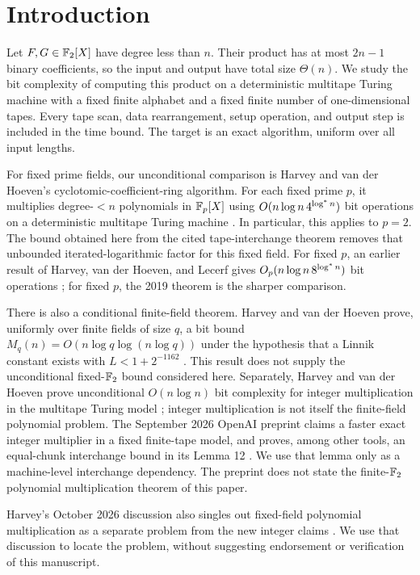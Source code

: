 \section{Introduction}

Let $F,G\in\mathbb F_2[X]$ have degree less than $n$. Their product has at most $2n-1$ binary coefficients, so the input and output have total size $\Theta(n)$. We study the bit complexity of computing this product on a deterministic multitape Turing machine with a fixed finite alphabet and a fixed finite number of one-dimensional tapes. Every tape scan, data rearrangement, setup operation, and output step is included in the time bound. The target is an exact algorithm, uniform over all input lengths.

For fixed prime fields, our unconditional comparison is Harvey and van der Hoeven's cyclotomic-coefficient-ring algorithm. For each fixed prime $p$, it multiplies degree-$<n$ polynomials in $\mathbb F_p[X]$ using $O(n\log n\,4^{\log^{*} n})$ bit operations on a deterministic multitape Turing machine \cite{HVH19Cyclo}. In particular, this applies to $p=2$. The bound obtained here from the cited tape-interchange theorem removes that unbounded iterated-logarithmic factor for this fixed field. For fixed $p$, an earlier result of Harvey, van der Hoeven, and Lecerf gives $O_p(n\log n\,8^{\log^{*} n})$ bit operations \cite{HVHL17}; for fixed $p$, the 2019 theorem is the sharper comparison.

There is also a conditional finite-field theorem. Harvey and van der Hoeven prove, uniformly over finite fields of size $q$, a bit bound $M_q(n)=O(n\log q\log(n\log q))$ under the hypothesis that a Linnik constant exists with $L<1+2^{-1162}$ \cite[Theorem 1.2]{HVH22Finite}. This result does not supply the unconditional fixed-$\mathbb F_2$ bound considered here. Separately, Harvey and van der Hoeven prove unconditional $O(n\log n)$ bit complexity for integer multiplication in the multitape Turing model \cite{HVH21Integer}; integer multiplication is not itself the finite-field polynomial problem. The September 2026 OpenAI preprint claims a faster exact integer multiplier in a fixed finite-tape model, and proves, among other tools, an equal-chunk interchange bound in its Lemma 12 \cite[Lemma 12, Section 4]{OpenAI26}. We use that lemma only as a machine-level interchange dependency. The preprint does not state the finite-$\mathbb F_2$ polynomial multiplication theorem of this paper.

Harvey's October 2026 discussion also singles out fixed-field polynomial multiplication as a separate problem from the new integer claims \cite[Section 4]{Harvey26Context}. We use that discussion to locate the problem, without suggesting endorsement or verification of this manuscript.

